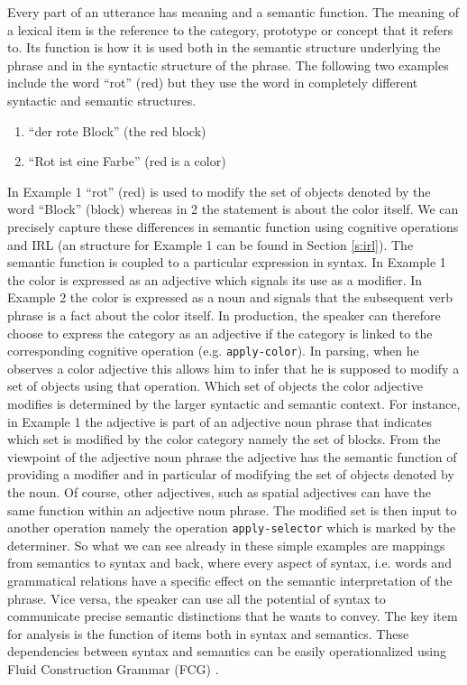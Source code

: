 Every part of an utterance has meaning and a semantic function. The 
meaning of a lexical item is the reference to the category, prototype 
or concept that it refers to. Its function is how it is used both 
in the semantic structure underlying the phrase  and in the
syntactic structure of the phrase. The following two examples
include the word ``rot'' (red) but they use the word in completely 
different syntactic and semantic structures. 
\begin{enumerate}
\item ``der rote Block'' (the red block)
\item ``Rot ist eine Farbe'' (red is a color)
\end{enumerate}
In Example 1 ``rot'' (red) is used to modify the set of objects
denoted by the word ``Block'' (block) whereas in 2 the
statement is about the color itself. We can precisely capture 
these differences in semantic function using cognitive operations
and IRL (an structure for Example 1 can be found in Section \ref{s:irl}). 
The semantic function is coupled to a particular expression
in syntax. In Example 1 the color is expressed
as an adjective which signals its use as a modifier.  
In Example 2 the color is expressed as a noun and
signals that the subsequent verb phrase is a fact about the color itself. 
In production, the speaker can therefore choose to express
the category as an adjective if the category is linked to the corresponding
cognitive operation (e.g. {\footnotesize\tt apply-color}). In parsing, when
he observes a color adjective this allows him to infer
that he is supposed to modify a set of objects using that operation.
Which set of objects the color adjective modifies is determined
by the larger syntactic and semantic context. For instance, in Example
1 the adjective is part of an adjective noun phrase that 
indicates which set is modified by the color category namely
the set of blocks. From the viewpoint of the adjective noun phrase
the adjective has the semantic function of providing a modifier and in 
particular of modifying the set of objects denoted by the noun. Of course, other adjectives,
such as spatial adjectives can have the same function within an 
adjective noun phrase. The modified set is then input to another
operation namely the operation {\footnotesize\tt apply-selector}
which is marked by the determiner. So what we can see already in 
these simple examples are mappings 
from semantics to syntax and back, where every aspect of syntax,
i.e. words and grammatical relations
have a specific effect on the semantic interpretation of the phrase.
Vice versa, the speaker can use all the potential of syntax to
communicate precise semantic distinctions that he wants to convey.
The key item for analysis is the function of items 
both in syntax and semantics. 
These dependencies between syntax and semantics can be easily
operationalized using Fluid Construction Grammar (FCG) 
\citep{beule2005hierarchy,steels2005linking}. 

